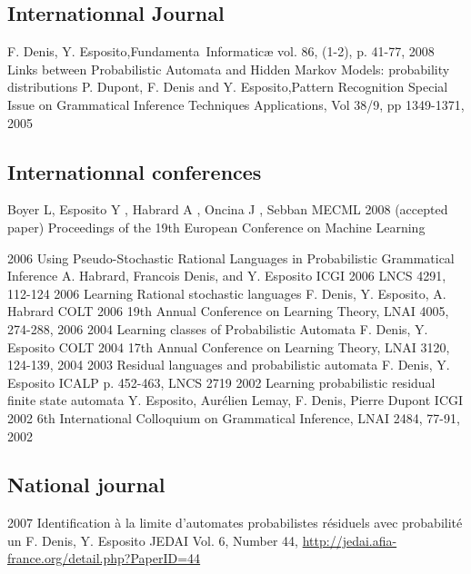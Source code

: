 \subsection*{Internationnal Journal}

{F. Denis, Y. Esposito,}{Fundamenta~Informatic\ae{}}
{vol. 86, (1-2), p. 41-77, 2008}\\
{Links between Probabilistic Automata and Hidden Markov Models: probability distributions}
{ P. Dupont, F. Denis and Y. Esposito,}{Pattern Recognition}
{Special Issue on Grammatical Inference Techniques \amper{} Applications, Vol 38/9, pp 1349-1371, 2005}

\subsection*{Internationnal conferences}

{Boyer L, Esposito Y , Habrard A , Oncina J , Sebban M}{ECML 2008}
{(accepted paper) Proceedings of the 19th European Conference on Machine Learning}

\article
{2006} %
{Using Pseudo-Stochastic Rational Languages in Probabilistic Grammatical Inference} %
{A. Habrard, Francois Denis, and Y. Esposito} %
{ICGI 2006} %
{LNCS 4291, 112-124} %
\article
{2006}
{Learning Rational stochastic languages}
{F. Denis, Y. Esposito, A. Habrard}
{COLT 2006}
{19th Annual Conference on Learning Theory, LNAI 4005, 274-288, 2006}
\article
{2004}
{Learning classes of Probabilistic Automata}
{F. Denis, Y. Esposito}
{COLT 2004}
{17th Annual Conference on Learning Theory, LNAI 3120, 124-139, 2004}
\article
{2003}
{Residual languages and probabilistic automata}
{F. Denis, Y. Esposito}
{ICALP}
{p. 452-463, LNCS 2719}
\article
{2002}
{Learning probabilistic residual finite state automata}
{Y. Esposito, Aurélien Lemay, F. Denis, Pierre Dupont}
{ICGI 2002}
{6th International Colloquium on Grammatical Inference,  LNAI 2484, 77-91, 2002}

\subsection*{National journal}

\article
{2007}
{Identification à la limite d'automates probabilistes résiduels avec probabilité un}
{F. Denis, Y. Esposito}
{JEDAI}
{Vol. 6, Number 44, \href{http://jedai.afia-france.org/detail.php?PaperID=44}{http://jedai.afia-france.org/detail.php?PaperID=44}}


